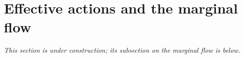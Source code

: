 \section{Effective actions and the marginal flow}\label{sec:partII-C}

\emph{This section is under construction; its subsection on the marginal flow is below.}


